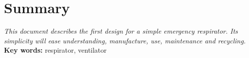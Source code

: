 \section*{Summary}
\textit{This document describes the first design for a simple emergency respirator. Its simplicity will ease understanding, manufacture, use, maintenance and recycling.}\\
\textbf{Key words:} respirator, ventilator